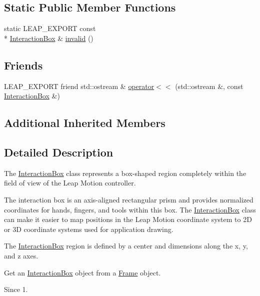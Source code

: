 \subsection*{Static Public Member Functions}
\begin{DoxyCompactItemize}
\item 
static L\+E\+A\+P\+\_\+\+E\+X\+P\+O\+R\+T const \\*
\hyperlink{class_leap_1_1_interaction_box}{Interaction\+Box} \& \hyperlink{class_leap_1_1_interaction_box_af3d181a4077f0b7e7334e3eb4db4b019}{invalid} ()
\end{DoxyCompactItemize}
\subsection*{Friends}
\begin{DoxyCompactItemize}
\item 
L\+E\+A\+P\+\_\+\+E\+X\+P\+O\+R\+T friend std\+::ostream \& \hyperlink{class_leap_1_1_interaction_box_a35cb230346cbaebc7c2a7dca7917c89e}{operator$<$$<$} (std\+::ostream \&, const \hyperlink{class_leap_1_1_interaction_box}{Interaction\+Box} \&)
\end{DoxyCompactItemize}
\subsection*{Additional Inherited Members}


\subsection{Detailed Description}
The \hyperlink{class_leap_1_1_interaction_box}{Interaction\+Box} class represents a box-\/shaped region completely within the field of view of the Leap Motion controller.

The interaction box is an axis-\/aligned rectangular prism and provides normalized coordinates for hands, fingers, and tools within this box. The \hyperlink{class_leap_1_1_interaction_box}{Interaction\+Box} class can make it easier to map positions in the Leap Motion coordinate system to 2\+D or 3\+D coordinate systems used for application drawing.



The \hyperlink{class_leap_1_1_interaction_box}{Interaction\+Box} region is defined by a center and dimensions along the x, y, and z axes.

Get an \hyperlink{class_leap_1_1_interaction_box}{Interaction\+Box} object from a \hyperlink{class_leap_1_1_frame}{Frame} object. \begin{DoxySince}{Since}
1. 
\end{DoxySince}


